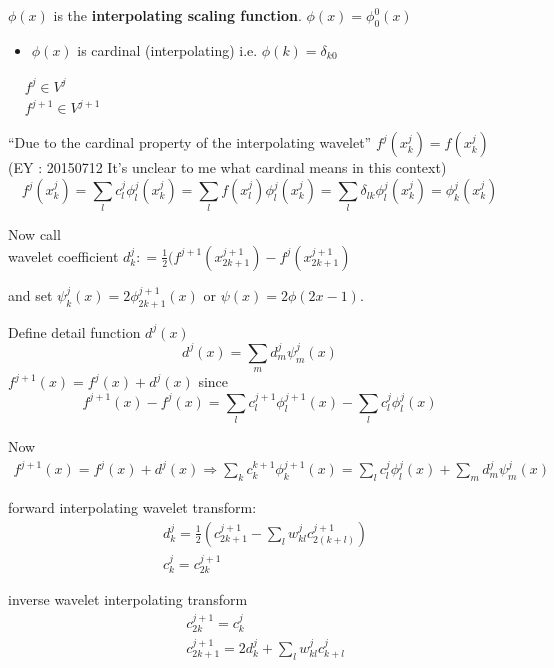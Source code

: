 \documentclass[twoside]{amsart}
\theoremstyle{plain}
\theoremstyle{definition}
\theoremstyle{remark}
\numberwithin{equation}{section}
\begin{document}
$\phi(x)$ is the \textbf{interpolating scaling function}.  $\phi(x) = \phi_0^0(x)$

\begin{itemize}
  \item $\phi(x)$ is cardinal (interpolating) i.e. $\phi(k) = \delta_{k0}$
\end{itemize}

$\begin{aligned}
  & f^j \in V^j \\ 
  & f^{j+1} \in V^{j+1}
\end{aligned}$

``Due to the cardinal property of the interpolating wavelet'' $f^j(x_k^j) = f(x^j_k)$ (EY : 20150712 It's unclear to me what cardinal means in this context) 
\[
f^j(x_k^j)= \sum_l c_l^j \phi_l^j(x_k^j) = \sum_l f(x_l^j) \phi_l^j(x^j_k) = \sum_l \delta_{lk} \phi_l^j(x_k^j) = \phi_k^j(x_k^j)
\]

Now call \\
wavelet coefficient $d^j_k : = \frac{1}{2} ( f^{j+1}(x^{j+1}_{2k+1} ) - f^j(x^{j+1}_{2k+1})$

and set $\psi_k^j(x) = 2\phi^{j+1}_{2k+1}(x) $ or $\psi(x) = 2\phi(2x-1)$.

Define detail function $d^j(x)$
\[
d^j(x) = \sum_m d_m^j\psi_m^j(x)
\]
$f^{j+1}(x) = f^j(x) + d^j(x)$ since 
\[
f^{j+1}(x) - f^j(x) = \sum_l c_l^{j+1} \phi_l^{j+1}(x) - \sum_l c^j_l \phi_l^j(x)
\]

Now
\[
\begin{gathered}
  f^{j+1}(x) = f^j(x) + d^j(x) \Longrightarrow \sum_k c_k^{k+1} \phi_k^{j+1}(x) = \sum_l c^j_l \phi_l^j(x) + \sum_m d_m^j\psi_m^j(x)
\end{gathered}
\]


forward interpolating wavelet transform:
\begin{equation}\label{Eq:forwardinterpolatingwavelettransform}
\begin{aligned}
  & d_k^j = \frac{1}{2} \left( c_{2k+1}^{j+1} - \sum_l w_{kl}^j c^{j+1}_{2(k+l) } \right) \\ 
  & c_k^j = c^{j+1}_{2k}
\end{aligned}
\end{equation}

inverse wavelet interpolating transform
\begin{equation}\label{Eq:invinterpolatingwavelettransform}
  \begin{aligned}
    & c_{2k}^{j+1} =c_k^j \\  
    &  c_{2k+1}^{j+1} = 2 d_k^j + \sum_l w_{kl}^j c_{k+l}^j
  \end{aligned}
\end{equation}
\end{document}
